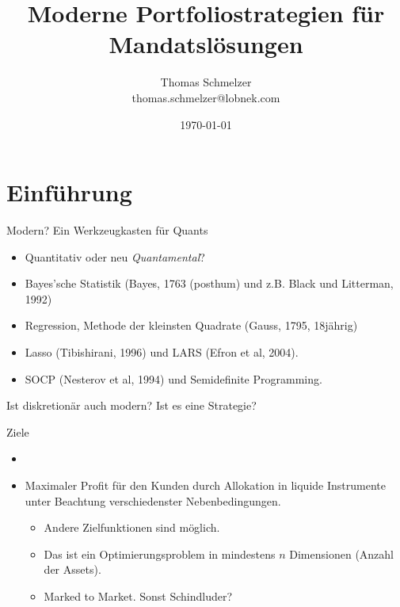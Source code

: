 \documentclass[10pt]{beamer}
\title{Moderne Portfoliostrategien für Mandatslösungen}
\subtitle{}
\date{\today}
\date{}
\author{Thomas Schmelzer\\ thomas.schmelzer@lobnek.com}
\institute{Lobnek Wealth Management}
\begin{document}
\maketitle


\section{Einführung}

\begin{frame}{Modern? Ein Werkzeugkasten für Quants}

\begin{itemize}
\item Quantitativ oder neu \textit{Quantamental}?
\item Bayes'sche Statistik (Bayes, 1763 (posthum) und z.B. Black und Litterman, 1992)
\item Regression, Methode der kleinsten Quadrate (Gauss, 1795, 18jährig)
\item Lasso (Tibishirani, 1996) und LARS (Efron et al, 2004).
\item SOCP (Nesterov et al, 1994) und Semidefinite Programming.
\end{itemize}

Ist diskretionär auch modern? Ist es eine Strategie?
\end{frame}

\begin{frame}[fragile]{Ziele}
\begin{itemize}
\item {}
\item Maximaler Profit für den Kunden durch Allokation in liquide Instrumente unter Beachtung verschiedenster Nebenbedingungen.
\begin{itemize}
\item Andere Zielfunktionen sind möglich.
\item Das ist ein Optimierungsproblem in mindestens $n$ Dimensionen (Anzahl der Assets).
\item Marked to Market. Sonst Schindluder? 
\end{itemize}
\end{itemize}
\end{frame}
\end{document}
